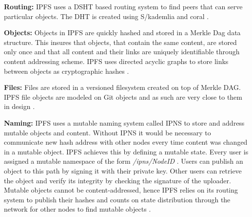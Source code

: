 \textbf{Routing:} IPFS uses a DSHT based routing system to find peers that can serve particular objects. The DHT is created using S/kademlia and coral \cite{DBLP:journals/corr/Benet14}.

\textbf{Objects:} Objects in IPFS are quickly hashed and stored in a Merkle Dag data structure. This insures that objects, that contain the same content, are stored only once and that all content and their links are uniquely identifiable through content addressing scheme. IPFS uses directed acyclic graphs to store links between objects as cryptographic hashes \cite{DBLP:journals/corr/Benet14}.
   
\textbf{Files:} Files are stored in a versioned filesystem created on top of Merkle DAG. IPFS file objects are modeled on Git objects and as such are very close to them in design \cite{DBLP:journals/corr/Benet14}.

\textbf{Naming:} IPFS uses a mutable naming system called IPNS to store and address mutable objects and content. Without IPNS it would be necessary to communicate new hash address with other nodes every time content was changed in a mutable object. IPFS achieves this by defining a mutable state. Every user is assigned a mutable namespace of the form \textit{/ipns/NodeID} \cite{DBLP:journals/corr/Benet14}. Users can publish an object to this path by signing it with their private key. Other users can retrieve the object and verify its integrity by checking the signature of the uploader.  Mutable objects cannot be content-addressed, hence IPFS relies on its routing system to publish their hashes and counts on state distribution through the network for other nodes to find mutable objects \cite{DBLP:journals/corr/Benet14}.
 

